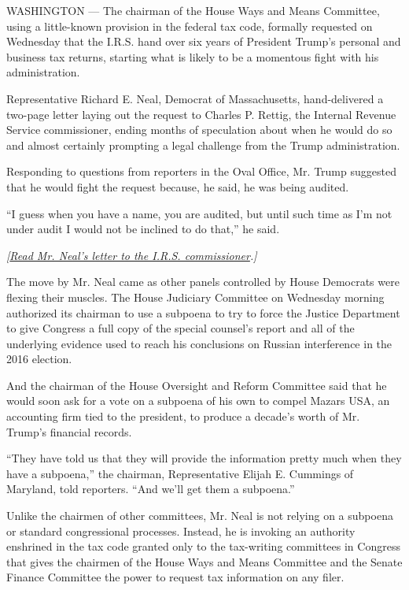 WASHINGTON --- The chairman of the House Ways and Means Committee, using
a little-known provision in the federal tax code, formally requested on
Wednesday that the I.R.S. hand over six years of President Trump's
personal and business tax returns, starting what is likely to be a
momentous fight with his administration.

Representative Richard E. Neal, Democrat of Massachusetts,
hand-delivered a two-page letter laying out the request to Charles P.
Rettig, the Internal Revenue Service commissioner, ending months of
speculation about when he would do so and almost certainly prompting a
legal challenge from the Trump administration.

Responding to questions from reporters in the Oval Office, Mr. Trump
suggested that he would fight the request because, he said, he was being
audited.

``I guess when you have a name, you are audited, but until such time as
I'm not under audit I would not be inclined to do that,'' he said.

\emph{{[}}\href{https://int.nyt.com/data/documenthelper/740-congress-request-trump-tax-returns/8fca455b44e383714434/optimized/full.pdf\#page=1}{\emph{Read
Mr. Neal's letter to the I.R.S. commissioner}}\emph{.{]}}

The move by Mr. Neal came as other panels controlled by House Democrats
were flexing their muscles. The House Judiciary Committee on Wednesday
morning authorized its chairman to use a subpoena to try to force the
Justice Department to give Congress a full copy of the special counsel's
report and all of the underlying evidence used to reach his conclusions
on Russian interference in the 2016 election.

And the chairman of the House Oversight and Reform Committee said that
he would soon ask for a vote on a subpoena of his own to compel Mazars
USA, an accounting firm tied to the president, to produce a decade's
worth of Mr. Trump's financial records.

``They have told us that they will provide the information pretty much
when they have a subpoena,'' the chairman, Representative Elijah E.
Cummings of Maryland, told reporters. ``And we'll get them a subpoena.''

Unlike the chairmen of other committees, Mr. Neal is not relying on a
subpoena or standard congressional processes. Instead, he is invoking an
authority enshrined in the tax code granted only to the tax-writing
committees in Congress that gives the chairmen of the House Ways and
Means Committee and the Senate Finance Committee the power to request
tax information on any filer.

